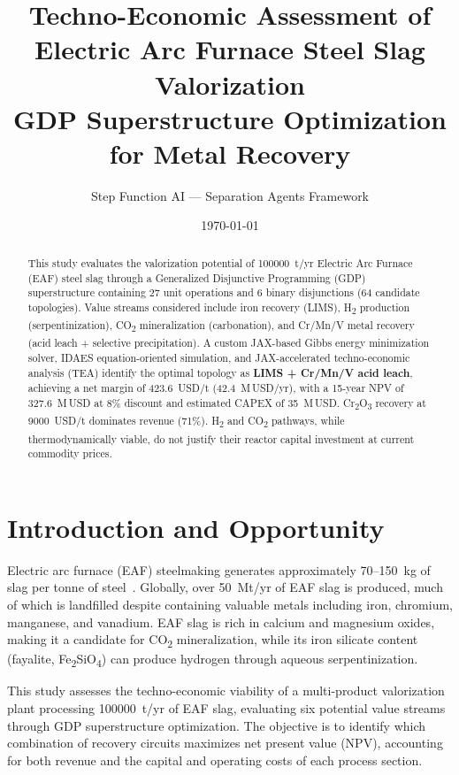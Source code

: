 \documentclass[11pt,a4paper]{article}
\title{\Large\textbf{Techno-Economic Assessment of\\Electric Arc Furnace Steel Slag Valorization}\\[0.3em]
\large GDP Superstructure Optimization for Metal Recovery}
\author{Step Function AI --- Separation Agents Framework}
\date{\today}
\begin{document}
\maketitle

\begin{abstract}
This study evaluates the valorization potential of \num{100000}~t/yr
Electric Arc Furnace (EAF) steel slag through a Generalized Disjunctive
Programming (GDP) superstructure containing 27 unit operations and 6 binary
disjunctions (64 candidate topologies). Value streams considered include iron
recovery (LIMS), H\textsubscript{2} production (serpentinization), CO\textsubscript{2}
mineralization (carbonation), and Cr/Mn/V metal recovery (acid leach +
selective precipitation). A custom JAX-based Gibbs energy minimization solver,
IDAES equation-oriented simulation, and JAX-accelerated techno-economic analysis
(TEA) identify the optimal topology as \textbf{LIMS + Cr/Mn/V acid leach},
achieving a net margin of 423.6~USD/t (42.4~M\,USD/yr),
with a 15-year NPV of 327.6~M\,USD at 8\% discount and estimated CAPEX
of 35~M\,USD. Cr\textsubscript{2}O\textsubscript{3} recovery at
\num{9000}~USD/t dominates revenue (71\%). H\textsubscript{2} and
CO\textsubscript{2} pathways, while thermodynamically viable, do not justify
their reactor capital investment at current commodity prices.
\end{abstract}

\section{Introduction and Opportunity}

Electric arc furnace (EAF) steelmaking generates approximately 70--150~kg
of slag per tonne of steel~\cite{worldsteel2023}. Globally, over
50~Mt/yr of EAF slag is produced, much of which is landfilled
despite containing valuable metals including iron, chromium, manganese, and
vanadium. EAF slag is rich in calcium and magnesium oxides, making it a
candidate for CO\textsubscript{2} mineralization, while its iron silicate
content (fayalite, Fe\textsubscript{2}SiO\textsubscript{4}) can produce
hydrogen through aqueous serpentinization.

This study assesses the techno-economic viability of a multi-product
valorization plant processing \num{100000}~t/yr of EAF slag,
evaluating six potential value streams through GDP superstructure optimization.
The objective is to identify which combination of recovery circuits maximizes
net present value (NPV), accounting for both revenue and the capital and
operating costs of each process section.
\end{document}
